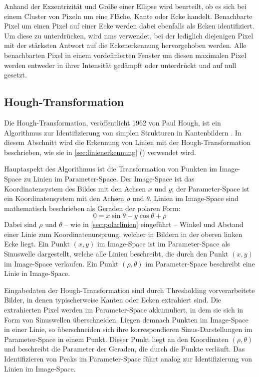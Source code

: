 Anhand der Exzentrizität und Größe einer Ellipse wird beurteilt, ob es sich bei einem Cluster von Pixeln um eine Fläche, Kante oder Ecke handelt. Benachbarte Pixel um einen Pixel auf einer Ecke werden dabei ebenfalls als Ecken identifiziert. Um diese zu unterdrücken, wird \ac{nms} verwendet, bei der lediglich diejenigen Pixel mit der stärksten Antwort auf die Eckenerkennung hervorgehoben werden. Alle benachbarten Pixel in einem vordefinierten Fenster um diesen maximalen Pixel werden entweder in ihrer Intensität gedämpft oder unterdrückt und auf null gesetzt.


\subsection{Hough-Transformation}
\label{sec:hough_transformation}

Die Hough-Transformation, veröffentlicht 1962 von Paul Hough, ist ein Algorithmus zur Identifizierung von simplen Strukturen in Kantenbildern \cite{hough_transform,hough_transform}. In diesem Abschnitt wird die Erkennung von Linien mit der Hough-Transformation beschrieben, wie sie in \autoref{sec:linienerkennung} () verwendet wird.

Hauptaspekt des Algorithmus ist die Transformation von Punkten im Image-Space zu Linien im Parameter-Space. Der Image-Space ist das Koordinatensystem des Bildes mit den Achsen $x$ und $y$; der Parameter-Space ist ein Koordinatensystem mit den Achsen $\rho$ und $\theta$. Linien im Image-Space sind mathematisch beschrieben als Geraden der polaren Form:
\[ 0 = x \sin{\theta} - y \cos{\theta} + \rho \]
Dabei sind $\rho$ und $\theta$ -- wie in \autoref{sec:polarlinien} eingeführt -- Winkel und Abstand einer Linie zum Koordinatenursprung, welcher in Bildern in der oberen linken Ecke liegt. Ein Punkt $(x, y)$ im Image-Space ist im Parameter-Space als Sinuswelle dargestellt, welche alle Linien beschreibt, die durch den Punkt $(x, y)$ im Image-Space verlaufen. Ein Punkt $(\rho, \theta)$ im Parameter-Space beschreibt eine Linie in Image-Space.

Eingabedaten der Hough-Transformation sind durch Thresholding vorverarbeitete Bilder, in denen typischerweise Kanten oder Ecken extrahiert sind. Die extrahierten Pixel werden im Parameter-Space akkumuliert, in dem sie sich in Form von Sinuswellen überschneiden. Liegen demnach Punkten im Image-Space in einer Linie, so überschneiden sich ihre korrespondieren Sinus-Darstellungen im Parameter-Space in einem Punkt. Dieser Punkt liegt an den Koordinaten $(\rho, \theta)$ und beschreibt die Parameter der Geraden, die durch die Punkte verläuft. Das Identifizieren von Peaks im Parameter-Space führt analog zur Identifizierung von Linien im Image-Space.


